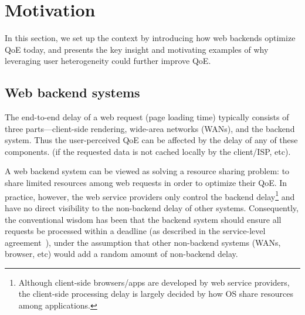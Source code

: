 
\section{Motivation}
In this section, we set up the context by introducing how web backends optimize QoE today, and presents the key insight and motivating examples of why leveraging user heterogeneity could further improve QoE.

\subsection{Web backend systems}
The end-to-end delay of a web request (\ie page loading time) typically consists of three parts---client-side rendering, wide-area networks (WANs), and the backend system.
Thus the user-perceived QoE can be affected by the delay of any of these components.
(if the requested data is not cached locally by the client/ISP, etc). 

A web backend system can be viewed as solving a resource sharing problem: to share limited resources among web requests in order to optimize their QoE.
In practice, however, the web service providers only control the backend delay\footnote{Although client-side browsers/apps are developed by web service providers, the client-side processing delay is largely decided by how OS share resources among applications.} and have no direct visibility to the non-backend delay of other systems. 
Consequently, the conventional wisdom has been that the backend system should ensure all requests be processed within a deadline (\eg as described in the service-level agreement~\cite{jang2015silo,serrano2013towards}), under the assumption that other non-backend systems (WANs, browser, etc) would add a random amount of non-backend delay.

